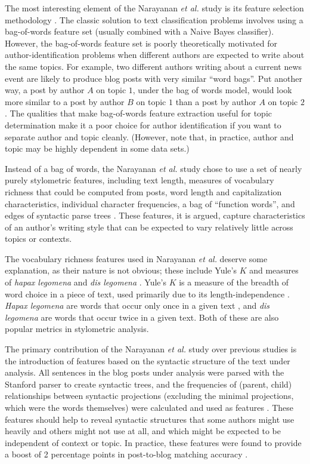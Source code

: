 \documentclass{article}
\begin{document}
The most interesting element of the Narayanan \textit{et al.} study is its feature selection methodology \cite{narayanan2012feasibility}. The classic solution to text classification problems involves using a bag-of-words feature set (usually combined with a Naive Bayes classifier). However, the bag-of-words feature set is poorly theoretically motivated for author-identification problems when different authors are expected to write about the same topics. For example, two different authors writing about a current news event are likely to produce blog posts with very similar ``word bags''. Put another way, a post by author $A$ on topic $1$, under the bag of words model, would look more similar to a post by author $B$ on topic $1$ than a post by author $A$ on topic $2$. The qualities that make bag-of-words feature extraction useful for topic determination make it a poor choice for author identification if you want to separate author and topic cleanly. (However, note that, in practice, author and topic may be highly dependent in some data sets.)

Instead of a bag of words, the Narayanan \textit{et al.} study chose to use a set of nearly purely stylometric features, including text length, measures of vocabulary richness that could be computed from posts, word length and capitalization characteristics, individual character frequencies, a bag of ``function words'', and edges of syntactic parse trees \cite{narayanan2012feasibility}. These features, it is argued, capture characteristics of an author's writing style that can be expected to vary relatively little across topics or contexts.

The vocabulary richness features used in Narayanan \textit{et al.} deserve some explanation, as their nature is not obvious; these include Yule's $K$ and measures of \textit{hapax legomena} and \textit{dis legomena} \cite{narayanan2012feasibility}. Yule's $K$ is a measure of the breadth of word choice in a piece of text, used primarily due to its length-independence \cite{miranda2005yule}. \textit{Hapax legomena} are words that occur only once in a given text \cite{oxford2012oxford}, and \textit{dis legomena} are words that occur twice in a given text. Both of these are also popular metrics in stylometric analysis.

The primary contribution of the Narayanan \textit{et al.} study over previous studies \cite{abbasi2008writeprints} is the introduction of features based on the syntactic structure of the text under analysis. All sentences in the blog posts under analysis were parsed with the Stanford parser to create syntactic trees, and the frequencies of (parent, child) relationships between syntactic projections (excluding the minimal projections, which were the words themselves) were calculated and used as features \cite{klein2003accurate, narayanan2012feasibility}. These features should help to reveal syntactic structures that some authors might use heavily and others might not use at all, and which might be expected to be independent of context or topic. In practice, these features were found to provide a boost of 2 percentage points in post-to-blog matching accuracy \cite{narayanan2012feasibility}.
\end{document}

